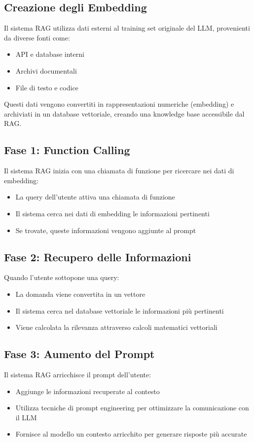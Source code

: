 \documentclass[12pt,a4paper,openright,twoside]{book}
\begin{document}
\subsection{Creazione degli Embedding}
Il sistema RAG utilizza dati esterni al training set originale del LLM, provenienti da diverse fonti come:
\begin{itemize}
    \item API e database interni
    \item Archivi documentali
    \item File di testo e codice
\end{itemize}
Questi dati vengono convertiti in rappresentazioni numeriche (embedding) e archiviati in un database vettoriale, creando una knowledge base accessibile dal RAG.

\subsection{Fase 1: Function Calling}
Il sistema RAG inizia con una chiamata di funzione per ricercare nei dati di embedding:
\begin{itemize}
    \item La query dell'utente attiva una chiamata di funzione
    \item Il sistema cerca nei dati di embedding le informazioni pertinenti
    \item Se trovate, queste informazioni vengono aggiunte al prompt
\end{itemize}

\subsection{Fase 2: Recupero delle Informazioni}
Quando l'utente sottopone una query:
\begin{itemize}
    \item La domanda viene convertita in un vettore
    \item Il sistema cerca nel database vettoriale le informazioni più pertinenti
    \item Viene calcolata la rilevanza attraverso calcoli matematici vettoriali
\end{itemize}

\subsection{Fase 3: Aumento del Prompt}
Il sistema RAG arricchisce il prompt dell'utente:
\begin{itemize}
    \item Aggiunge le informazioni recuperate al contesto
    \item Utilizza tecniche di prompt engineering per ottimizzare la comunicazione con il LLM
    \item Fornisce al modello un contesto arricchito per generare risposte più accurate
\end{itemize}
\end{document}
